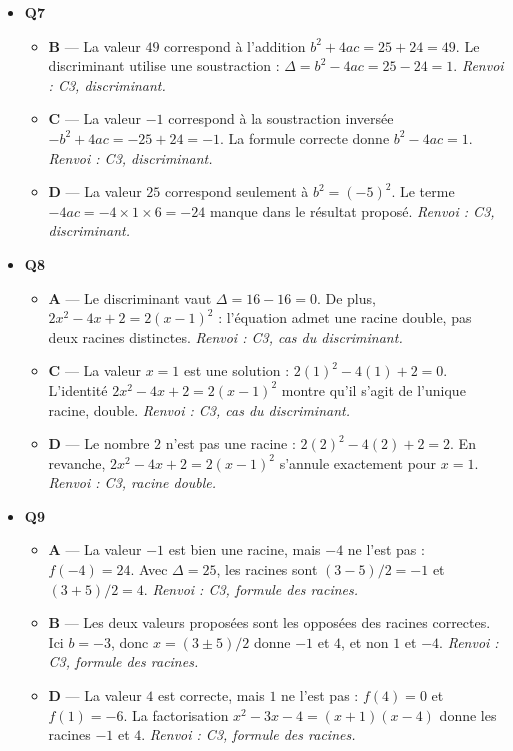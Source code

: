 \begin{itemize}
\begin{itemize}
  \end{itemize}
  \item \textbf{Q7}
  \begin{itemize}
    \item \textbf{B} — La valeur $49$ correspond à l’addition $b^2+4ac=25+24=49$. Le discriminant utilise une soustraction : $\Delta=b^2-4ac=25-24=1$. \emph{Renvoi : C3, discriminant.}
    \item \textbf{C} — La valeur $-1$ correspond à la soustraction inversée $-b^2+4ac=-25+24=-1$. La formule correcte donne $b^2-4ac=1$. \emph{Renvoi : C3, discriminant.}
    \item \textbf{D} — La valeur $25$ correspond seulement à $b^2=(-5)^2$. Le terme $-4ac=-4\times1\times6=-24$ manque dans le résultat proposé. \emph{Renvoi : C3, discriminant.}
  \end{itemize}
  \item \textbf{Q8}
  \begin{itemize}
    \item \textbf{A} — Le discriminant vaut $\Delta=16-16=0$. De plus, $2x^2-4x+2=2(x-1)^2$ : l’équation admet une racine double, pas deux racines distinctes. \emph{Renvoi : C3, cas du discriminant.}
    \item \textbf{C} — La valeur $x=1$ est une solution : $2(1)^2-4(1)+2=0$. L’identité $2x^2-4x+2=2(x-1)^2$ montre qu’il s’agit de l’unique racine, double. \emph{Renvoi : C3, cas du discriminant.}
    \item \textbf{D} — Le nombre $2$ n’est pas une racine : $2(2)^2-4(2)+2=2$. En revanche, $2x^2-4x+2=2(x-1)^2$ s’annule exactement pour $x=1$. \emph{Renvoi : C3, racine double.}
  \end{itemize}
  \item \textbf{Q9}
  \begin{itemize}
    \item \textbf{A} — La valeur $-1$ est bien une racine, mais $-4$ ne l’est pas : $f(-4)=24$. Avec $\Delta=25$, les racines sont $(3-5)/2=-1$ et $(3+5)/2=4$. \emph{Renvoi : C3, formule des racines.}
    \item \textbf{B} — Les deux valeurs proposées sont les opposées des racines correctes. Ici $b=-3$, donc $x=(3\pm5)/2$ donne $-1$ et $4$, et non $1$ et $-4$. \emph{Renvoi : C3, formule des racines.}
    \item \textbf{D} — La valeur $4$ est correcte, mais $1$ ne l’est pas : $f(4)=0$ et $f(1)=-6$. La factorisation $x^2-3x-4=(x+1)(x-4)$ donne les racines $-1$ et $4$. \emph{Renvoi : C3, formule des racines.}

\end{itemize}
\end{itemize}
